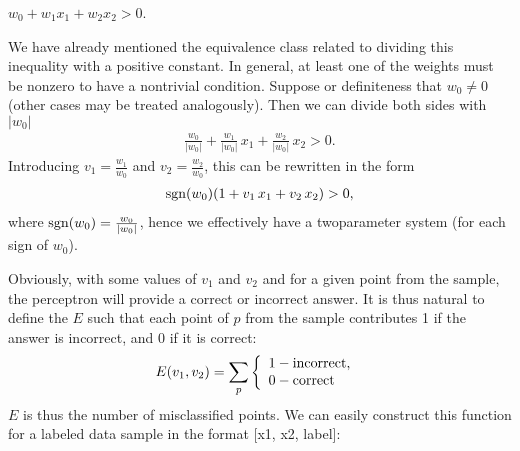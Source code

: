 \documentclass[letterpaper,10pt,english]{jupyterBook}
\begin{document}
\sphinxAtStartPar
\(w_0+w_1 x_1 + w_2 x_2 > 0\).

\sphinxAtStartPar
We have already mentioned the equivalence class related to dividing this inequality with a
positive constant. In general, at least one of the weights must be nonzero to have a nontrivial condition. Suppose or definiteness that \(w_0 \neq 0\) (other cases may be treated analogously). Then we can divide both sides with \(|w_0|\)
\begin{equation*}
\begin{split}\frac{w_0}{|w_0|}+\frac{w_1}{|w_0|} \, x_1 + \frac{w_2}{|w_0|} \, x_2 > 0. \end{split}
\end{equation*}
\sphinxAtStartPar
Introducing \(v_1=\frac{w_1}{w_0}\) and \(v_2=\frac{w_2}{w_0}\), this can be rewritten in the form
\begin{equation*}
\begin{split}{\rm sgn}(w_0)( 1+v_1 \, x_1 +v_2 \, x_2) > 0,\end{split}
\end{equation*}
\sphinxAtStartPar
where \({\rm sgn}(w_0) = \frac{w_0}{|w_0|}\), hence we effectively have a two\sphinxhyphen{}parameter system (for each sign of \(w_0\)).

\sphinxAtStartPar
Obviously, with some values of \( v_1 \) and \( v_2 \) and for a given point from the sample, the perceptron will provide a correct or incorrect answer. It is thus natural to define the  \(E\) such that each point of \(p\) from the sample contributes 1 if the answer is incorrect, and 0 if it is correct:
\begin{equation*}
\begin{split} E(v_1,v_2)=\sum_p \left\{ \begin{array}{ll} 1 -{\rm incorrect,~}\\ 0 -{\rm correct} \end{array}\right .\end{split}
\end{equation*}
\sphinxAtStartPar
\(E\) is thus the number of misclassified points. We can easily construct this function for a labeled data sample in the format {[}x1, x2, label{]}:
\end{document}
